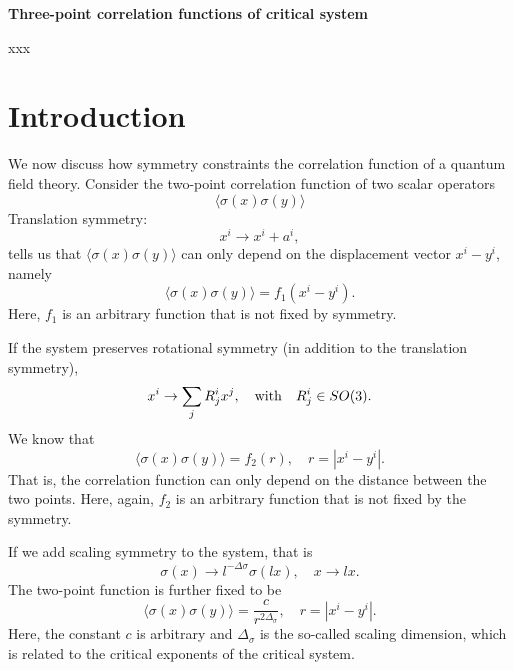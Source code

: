 \documentclass[prb,twocolumn,11pt]{revtex4-1}
\begin{document}
\def\thesection{\arabic{section}}
\def\thesubsection{\arabic{section}.\arabic{subsection}}

\onecolumngrid
\begin{center}
{\Large {\bf Three-point correlation functions of critical system}}
\vspace{10pt}

{\Large
\bigskip
xxx
\bigskip
}
\end{center}
\section{Introduction}
We now discuss how symmetry constraints the correlation function of a quantum field theory. Consider the two-point correlation function of two scalar operators
\begin{equation}
\langle\sigma(x)\sigma(y)\rangle    
\end{equation}
Translation symmetry:
\begin{equation}
    x^i \rightarrow x^i +a^i,
\end{equation}
tells us that $\langle\sigma(x)\sigma(y)\rangle $ can only depend on the displacement vector $x^i-y^i$, namely 
\begin{equation}
\langle\sigma(x)\sigma(y)\rangle  = f_1(x^i-y^i).
\end{equation}
Here, $f_1$ is an arbitrary function that is not fixed by symmetry.

If the system preserves rotational symmetry (in addition to the translation symmetry), 
\begin{equation}
    x^i\rightarrow \sum_j R^i_j x^j, \quad {\rm with} \quad R^i_j\in SO(3).
\end{equation}
We know that 
\begin{equation}
\langle\sigma(x)\sigma(y)\rangle  = f_2(r),\quad r=|x^i-y^i|.
\end{equation}
That is, the correlation function can only depend on the distance between the two points. Here, again, $f_2$ is an arbitrary function that is not fixed by the symmetry.

If we add scaling symmetry to the system, that is 
\begin{equation}
\sigma(x)\rightarrow l^{-\Delta{\sigma}} \sigma(l x), \quad x \rightarrow l x.
\end{equation}
The two-point function is further fixed to be
\begin{equation}
\langle\sigma(x)\sigma(y)\rangle = \frac{c}{r^{2\Delta_{\sigma}}}, \quad r=|x^i-y^i|.
\end{equation}
Here, the constant $c$ is arbitrary and $\Delta_{\sigma}$ is the so-called scaling dimension, which is related to the critical exponents of the critical system.
\end{document}
